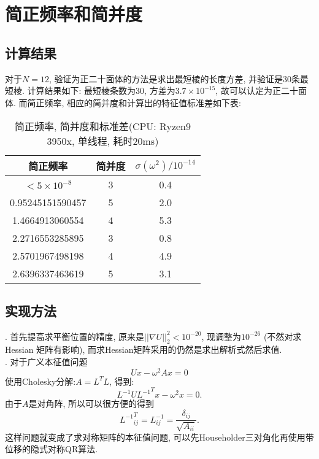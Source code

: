 \documentclass[UTF8]{ctexart}
\begin{document}
    \section{简正频率和简并度}
        \subsection{计算结果}
            \indent 对于$N=12$, 验证为正二十面体的方法是求出最短棱的长度方差, 并验证是30条最短棱. 计算结果如下: 最短棱条数为30,
            方差为$3.7\times10^{-15}$, 故可以认定为正二十面体. 而简正频率, 相应的简并度和计算出的特征值标准差如下表:
            \begin{table}[H]
                \centering
                \caption{简正频率, 简并度和标准差(CPU: Ryzen9 3950x, 单线程, 耗时20ms)}
                \begin{tabular}{|c|c|c|}
                    \hline
                    简正频率&简并度&$\sigma(\omega^2)/10^{-14}$\\
                    \hline
                    $<5\times10^{-8}$&3&0.4\\
                    \hline
                    0.95245151590457&5&2.0\\
                    \hline
                    1.4664913060554&4&5.3\\
                    \hline
                    2.2716553285895&3&0.8\\
                    \hline
                    2.5701967498198&4&4.9\\
                    \hline
                    2.6396337463619&5&3.1\\
                    \hline
                \end{tabular}
            \end{table}
        \subsection{实现方法}
            . 首先提高求平衡位置的精度, 原来是$||\nabla U||_2^2<10^{-20}$, 现调整为$10^{-26}$ (不然对求 Hessian 矩阵有影响),
            而求Hessian矩阵采用的仍然是求出解析式然后求值.\\
            . 对于广义本征值问题
            \begin{equation}
                Ux-\omega^2Ax=0
            \end{equation}
            使用Cholesky分解:$A=L^TL$, 得到:
            \begin{equation}
                L^{-1}U{L^{-1}}^Tx-\omega^2x=0.
            \end{equation}
            由于$A$是对角阵, 所以可以很方便的得到
            \begin{equation}
                {L^{-1}}^T_{ij}=L^{-1}_{ij}=\dfrac{\delta_{ij}}{\sqrt{A_{ii}}}.
            \end{equation}
            这样问题就变成了求对称矩阵的本征值问题, 可以先Householder三对角化再使用带位移的隐式对称QR算法.
    
    
\end{document}
